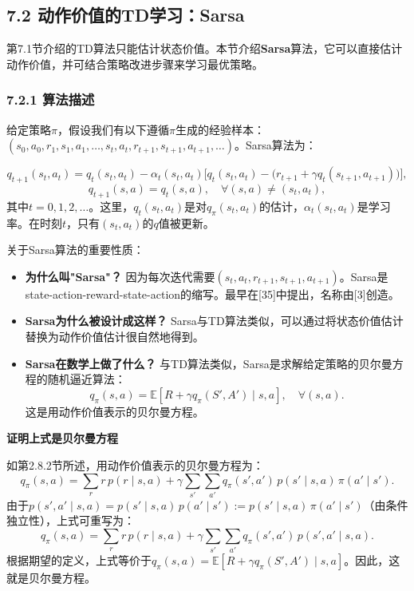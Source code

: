 \documentclass[UTF8]{article}
\begin{document}
\subsection*{7.2 动作价值的TD学习：Sarsa}

第7.1节介绍的TD算法只能估计状态价值。本节介绍\textbf{Sarsa}算法，它可以直接估计动作价值，并可结合策略改进步骤来学习最优策略。

\subsubsection*{7.2.1 算法描述}

给定策略$\pi$，假设我们有以下遵循$\pi$生成的经验样本：$(s_0, a_0, r_1, s_1, a_1, \dots, s_t, a_t, r_{t+1}, s_{t+1}, a_{t+1}, \dots)$。Sarsa算法为：

\begin{equation}
q_{t+1}(s_t, a_t) = q_t(s_t, a_t) - \alpha_t(s_t, a_t)\Big[q_t(s_t, a_t) - \big(r_{t+1} + \gamma q_t(s_{t+1}, a_{t+1})\big)\Big],
\label{eq:sarsa}
\end{equation}
\[
q_{t+1}(s, a) = q_t(s, a), \quad \forall (s, a) \neq (s_t, a_t),
\]
其中$t = 0, 1, 2, \dots$。这里，$q_t(s_t, a_t)$是对$q_\pi(s_t, a_t)$的估计，$\alpha_t(s_t, a_t)$是学习率。在时刻$t$，只有$(s_t, a_t)$的$q$值被更新。

关于Sarsa算法的重要性质：

\begin{itemize}
    \item \textbf{为什么叫"Sarsa"？} 因为每次迭代需要$(s_t, a_t, r_{t+1}, s_{t+1}, a_{t+1})$。Sarsa是state-action-reward-state-action的缩写。最早在[35]中提出，名称由[3]创造。

    \item \textbf{Sarsa为什么被设计成这样？} Sarsa与TD算法类似，可以通过将状态价值估计替换为动作价值估计很自然地得到。

    \item \textbf{Sarsa在数学上做了什么？} 与TD算法类似，Sarsa是求解给定策略的贝尔曼方程的随机逼近算法：
    \[
    q_\pi(s, a) = \mathbb{E}[R + \gamma q_\pi(S', A') \mid s, a], \quad \forall (s, a).
    \]
    这是用动作价值表示的贝尔曼方程。
\end{itemize}

\begin{proofbox}
\textbf{证明上式是贝尔曼方程}

如第2.8.2节所述，用动作价值表示的贝尔曼方程为：
\[
q_\pi(s, a) = \sum_r r\,p(r \mid s, a) + \gamma \sum_{s'} \sum_{a'} q_\pi(s', a')\,p(s' \mid s, a)\,\pi(a' \mid s').
\]
由于$p(s', a' \mid s, a) = p(s' \mid s, a)\,p(a' \mid s') := p(s' \mid s, a)\,\pi(a' \mid s')$（由条件独立性），上式可重写为：
\[
q_\pi(s, a) = \sum_r r\,p(r \mid s, a) + \gamma \sum_{s'} \sum_{a'} q_\pi(s', a')\,p(s', a' \mid s, a).
\]
根据期望的定义，上式等价于$q_\pi(s, a) = \mathbb{E}[R + \gamma q_\pi(S', A') \mid s, a]$。因此，这就是贝尔曼方程。
\end{proofbox}
\end{document}
